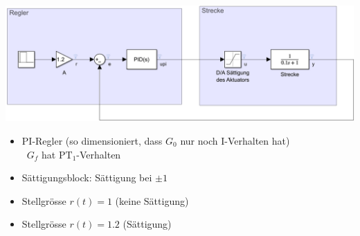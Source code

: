 \begin{minipage}[c]{0.48\columnwidth}
    \includegraphics[width=\columnwidth]{images/windup_beispiel.png}
\end{minipage}
\hfill
\begin{minipage}[c]{0.48\columnwidth}
    \begin{itemize}
        \item PI-Regler (so dimensioniert, dass $G_0$ nur noch I-Verhalten hat) \\
            \textrightarrow\ $G_f$ hat $\text{PT}_1$-Verhalten
        \item Sättigungsblock: Sättigung bei $\pm 1$
        \item Stellgrösse $r(t) = 1$ (keine Sättigung)
        \item Stellgrösse $r(t) = 1.2$ (Sättigung)
    \end{itemize}
\end{minipage}

